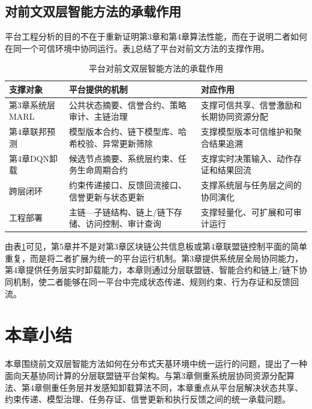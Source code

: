\subsection{对前文双层智能方法的承载作用}

平台工程分析的目的不在于重新证明第3章和第4章算法性能，而在于说明二者如何在同一个可信环境中协同运行。表\ref{tab:platform_support}总结了平台对前文方法的支撑作用。

\begin{table}[htbp]
  \centering
  \caption{平台对前文双层智能方法的承载作用}
  \label{tab:platform_support}
  \begin{tabular}{p{3.0cm}p{5.0cm}p{5.0cm}}
    \toprule
    支撑对象 & 平台提供的机制 & 对应作用 \\
    \midrule
    第3章系统层MARL & 公共状态摘要、信誉合约、策略审计、主链治理 & 支撑可信共享、信誉激励和长期协同资源分配 \\
    第4章联邦预测 & 模型版本合约、链下模型库、哈希校验、异常更新筛除 & 支撑模型版本可信维护和聚合结果追溯 \\
    第4章DQN卸载 & 候选节点摘要、系统层约束、任务生命周期合约 & 支撑实时决策输入、动作存证和结果回流 \\
    跨层闭环 & 约束传递接口、反馈回流接口、信誉更新与状态更新 & 支撑系统层与任务层之间的协同演化 \\
    工程部署 & 主链—子链结构、链上/链下存储、访问控制、审计查询 & 支撑轻量化、可扩展和可审计运行 \\
    \bottomrule
  \end{tabular}
\end{table}

由表\ref{tab:platform_support}可见，第5章并不是对第3章区块链公共信息板或第4章联盟链控制平面的简单重复，而是将二者扩展为统一的平台运行机制。第3章提供系统层全局协同能力，第4章提供任务层实时卸载能力，本章则通过分层联盟链、智能合约和链上/链下协同机制，使二者能够在同一平台中完成状态传递、规则约束、行为存证和反馈回流。

\section{本章小结}
\label{sec:platform_summary}

本章围绕前文双层智能方法如何在分布式天基环境中统一运行的问题，提出了一种面向天基协同计算的分层联盟链平台架构。与第3章侧重系统层协同资源分配算法、第4章侧重任务层并发感知卸载算法不同，本章重点从平台层解决状态共享、约束传递、模型治理、任务存证、信誉更新和执行反馈之间的统一承载问题。

